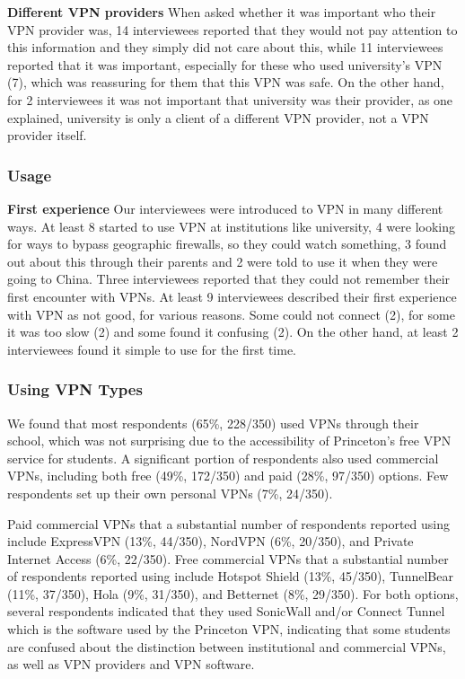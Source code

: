 \textbf{Different VPN providers} When asked whether it was important who their
VPN provider was, 14 interviewees reported that they would not pay attention
to this information and they simply did not care about this, while 11
interviewees reported that it was important, especially for these who used
university’s VPN (7), which was reassuring for them that this VPN was safe. On
the other hand, for 2 interviewees it was not important that university was
their provider, as one explained, university is only a client of a different
VPN provider, not a VPN provider itself. 






\subsubsection{Usage} \textbf{First experience} Our interviewees were
introduced to VPN in many different ways. At least 8 started to use VPN at
institutions like university, 4 were looking for ways to bypass geographic
firewalls, so they could watch something, 3 found out about this through their
parents and 2 were told to use it when they were going to China. Three
interviewees reported that they could not remember their first encounter with
VPNs.  At least 9 interviewees described their first experience with VPN as
not good, for various reasons. Some could not connect (2), for some it was too
slow (2) and some found it confusing (2).  On the other hand, at least 2
interviewees found it simple to use for the first time.


\subsubsection{Using VPN Types}

We found that most respondents (65\%, 228/350) used VPNs through their school,
which was not surprising due to the accessibility of Princeton’s free VPN
service for students. A significant portion of respondents also used
commercial VPNs, including both free (49\%, 172/350) and paid (28\%, 97/350)
options. Few respondents set up their own personal VPNs (7\%, 24/350).

Paid commercial VPNs that a substantial number of respondents reported using
include ExpressVPN (13\%, 44/350), NordVPN (6\%, 20/350), and Private Internet
Access (6\%, 22/350). Free commercial VPNs that a substantial number of
respondents reported using include Hotspot Shield (13\%, 45/350), TunnelBear
(11\%, 37/350), Hola (9\%, 31/350), and Betternet (8\%, 29/350). For both
options, several respondents indicated that they used SonicWall and/or Connect
Tunnel which is the software used by the Princeton VPN, indicating that some
students are confused about the distinction between institutional and
commercial VPNs, as well as VPN providers and VPN software.

